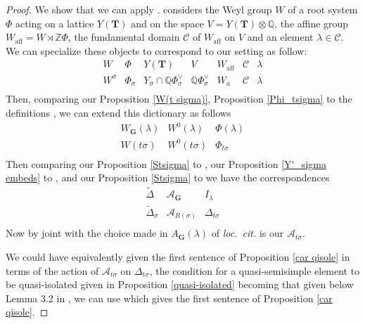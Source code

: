 \documentclass{amsart}
\numberwithin{equation}{section}
\theoremstyle{definition}
\theoremstyle{remark}
\newcommand\bG{{\mathbf G}}
\newcommand\bT{{\mathbf T}}
\newcommand\BQ{{\mathbb Q}}
\newcommand\BZ{{\mathbb Z}}
\newcommand\CA{{\mathcal A}}
\newcommand\CC{{\mathcal C}}
\newcommand\Wa{W_a}
\begin{document}
\begin{proof}
We show that we can  apply \cite[Corollary 4.3(b)]{cedric}. \cite{cedric}
considers the Weyl group $W$ of a root system $\Phi$ acting on a lattice
$Y(\bT)$ and on the space $V=Y(\bT)\otimes\BQ$, the affine group 
$W_{\text{aff}}=W\rtimes\BZ\Phi$, the fundamental domain $\CC$ of
$W_{\text{aff}}$
on $V$ and an element $\lambda\in\CC$. We can specialize these objects 
to correspond to our setting as follow:
$$\begin{array}{ccccccc}
W&\Phi&Y(\bT)&V&W_{\text{aff}}&\CC&\lambda\\
W^\sigma&\Phi_\sigma&Y_\sigma\cap\BQ\Phi_\sigma^\vee&\BQ\Phi_\sigma^\vee&\Wa&\CC&\lambda\\
\end{array} $$
Then, comparing our  Proposition \ref{W(t sigma)},
Proposition \ref{Phi_tsigma} to the definitions
\cite[below Lemma 3.1]{cedric}, we can extend this dictionary as follows 
$$\begin{array}{cccc}
W_\bG(\lambda)&W^0(\lambda)&\Phi(\lambda)\\
W(t\sigma)&W^0(t\sigma)&\Phi_{t\sigma}\\
\end{array}$$
Then comparing our Proposition \ref{Stsigma} to \cite[proof of 3.5]{cedric},
our Proposition \ref{Y'_sigma embeds} to \cite[3.C]{cedric}, and our Proposition
\ref{Stsigma} to \cite[Proposition 3.14]{cedric} we have the correspondences
$$\begin{array}{ccc}
\tilde\Delta&\CA_\bG&I_\lambda\\
\tilde\Delta_\sigma&\CA_{R(\sigma)}&\Delta_{t\sigma}\\
\end{array}$$
Now by \cite[below Lemma 3.1]{cedric} joint with the choice made
in \cite[last line before section 4]{cedric} $A_\bG(\lambda)$ of {\it loc.~cit.}
is our $\CA_{t\sigma}$.

We could have equivalently given the first sentence of Proposition \ref{car qisole}
in terms of the action of $\CA_{t\sigma}$ on $\Delta_{t\sigma}$,
the condition for a quasi-semisimple element to be quasi-isolated given
in Proposition \ref{quasi-isolated} becoming that given below Lemma
3.2 in \cite{cedric}, we can use \cite[Corollary 4.3 (b)]{cedric} which gives
the first sentence of Proposition \ref{car qisole}.


\end{proof}
\end{document}
